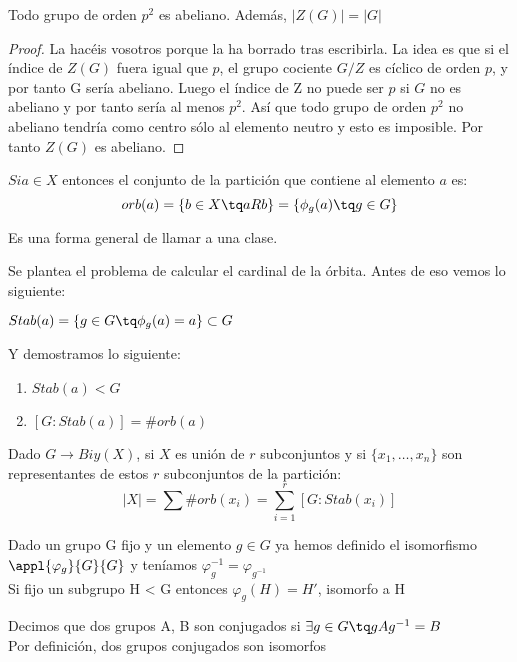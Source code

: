 \documentclass[nochap]{apuntes}
\begin{document}
\begin{theorem}
Todo grupo de orden $p^2$ es abeliano. Además, $|Z(G)| = |G|$
\end{theorem}

\begin{proof}
La hacéis vosotros porque \href{http://www.uam.es/personal_pdi/ciencias/villa/imagenes/Foto18.jpg}{\color{blue}{Orlando}} la ha borrado tras escribirla.
La idea es que si el índice de $Z(G)$ fuera igual que $p$, el grupo cociente $G/Z$ es cíclico de orden $p$, y por tanto G sería abeliano. Luego el índice de Z no puede ser $p$ si $G$ no es abeliano y por tanto sería al menos $p^2$. Así que todo grupo de orden $p^2$ no abeliano tendría como centro sólo al elemento neutro y esto es imposible. Por tanto $Z(G)$ es abeliano.
\end{proof}


\begin{defn}[Órbita]
$Si a\in X$ entonces el conjunto de la partición que contiene al elemento $a$ es:\\

$$orb(a) = \{ b\in X\tq aRb\} = \{ \phi_g(a) \tq g\in G\}$$

Es una forma general de llamar a una clase.
\end{defn}

Se plantea el problema de calcular el cardinal de la órbita.
Antes de eso vemos lo siguiente:

\begin{defn}[Estabilizador]
$Stab(a) = \{ g\in G \tq \phi_g (a) = a\} \subset G$
\end{defn}

Y demostramos lo siguiente:
\begin{enumerate}
\item $Stab(a) < G$
\item $[G: Stab(a)] = \# orb(a)$
\end{enumerate}

\obs Dado $G\longrightarrow Biy(X)$, si $X$ es unión de $r$ subconjuntos y si $\{ x_1, \hdots, x_n\} $ son representantes de estos $r$ subconjuntos de la partición:\\
$$|X| = \sum \# orb(x_i) = \sum_{i=1}^r[G:Stab(x_i)]$$

Dado un grupo G fijo y un elemento $g\in G$  ya hemos definido el isomorfismo $\appl{\varphi_g}{G}{G}$  y teníamos $\varphi_{g}^{-1}=\varphi_{g^{-1}}$\\
Si fijo un subgrupo H < G entonces $\varphi_g(H)=H'$, isomorfo a H\\
\begin{defn}[Conjugado]
 Decimos que dos grupos A, B son conjugados si $\exists g \in G \tq gAg^{-1}=B$\\
 Por definición, dos grupos conjugados son isomorfos
\end{defn}
\end{document}
